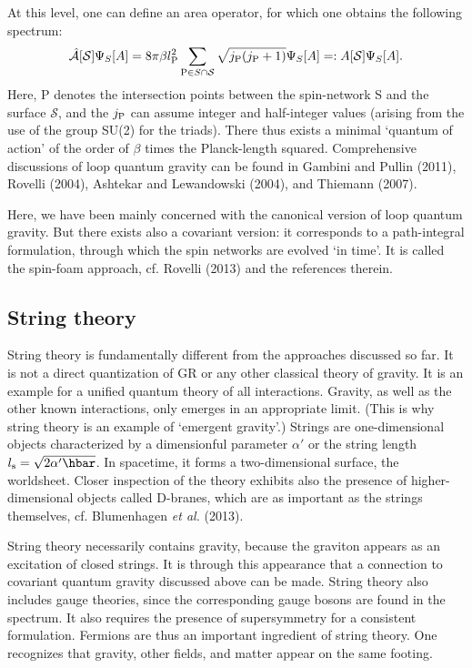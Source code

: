 \documentclass[12pt]{article}
\newcommand{\be}{\begin{equation}}
\newcommand{\ee}{\end{equation}}
\newcommand{\lb}{\label}
\begin{document}
At this level, one can define an area operator, for which one obtains
the following spectrum:
\be
\lb{6.31}
\hat{\mathcal A}[{\mathcal S}]\Psi_S[A]=8\pi\beta l_{\rm P}^2
\sum_{{\rm P}\in S\cap{\mathcal S}}\sqrt{j_{\rm P}(j_{\rm P}+1)}\Psi_S[A]
=: A[{\mathcal S}]\Psi_S[A].
\ee
Here, P denotes the intersection points between the spin-network S and
the surface ${\mathcal S}$, and the $j_{\rm P}$ can assume integer and
half-integer values (arising from the use of the group SU(2) for the
triads). There thus exists a minimal `quantum of action' of the order
of $\beta$ times the Planck-length squared. 
Comprehensive discussions of loop quantum gravity can be found in 
Gambini and Pullin (2011), Rovelli (2004), Ashtekar and Lewandowski
(2004), and Thiemann (2007). 

Here, we have been mainly concerned with the canonical version of loop
quantum gravity. But there
exists also a covariant version: it
corresponds to a path-integral formulation, through which the spin
networks are evolved `in time'. It is called the 
spin-foam approach, cf. Rovelli (2013) and the references therein.

\subsection{String theory}

String theory is fundamentally different from the approaches discussed
so far. It is not a direct quantization of GR or any other classical theory of
gravity. It is an example for a unified quantum theory of all
interactions. Gravity, as well as the other
known interactions, only emerges in an appropriate limit. 
(This is why string theory is an example of `emergent gravity'.) Strings are
one-dimensional objects characterized by a dimensionful parameter
$\alpha'$ or the string length $l_{\rm s}=\sqrt{2\alpha'\hbar}$.
In spacetime, it forms a two-dimensional surface,
the worldsheet. Closer inspection of the theory exhibits also the
presence of higher-dimensional objects called D-branes, which are as
important as the strings themselves, cf. Blumenhagen {\em et al.} (2013). 

String theory necessarily contains gravity, because the graviton
appears as an excitation of closed strings. It is through this
appearance that a connection to covariant quantum gravity discussed
above can be made. String theory also includes gauge theories, since
the corresponding gauge bosons are found in the spectrum. It also
requires the presence of supersymmetry for a consistent
formulation. Fermions are thus an important ingredient of string
theory. One recognizes that gravity, other fields, and matter appear
on the same footing.   
\end{document}
